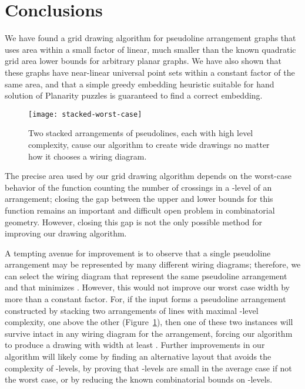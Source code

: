 \documentclass[oribibl]{llncs}
\begin{document}
\section{Conclusions}

We have found a grid drawing algorithm for pseudoline arrangement graphs that uses area within a small factor of linear, much smaller than the known quadratic grid area lower bounds for arbitrary planar graphs. We have also shown that these graphs have near-linear universal point sets within a constant factor of the same area, and that a simple greedy embedding heuristic suitable for hand solution of Planarity puzzles is guaranteed to find a correct embedding.

\begin{figure}[t]
\centering\texttt{[image: stacked-worst-case]}
\caption{Two stacked arrangements of  pseudolines, each with high level complexity, cause our algorithm to create wide drawings no matter how it chooses a wiring diagram.}
\label{fig:stacked-worst-case}
\vspace{-2ex}
\end{figure}

The precise area used by our grid drawing algorithm depends on the worst-case behavior of the function  counting the number of crossings in a -level of an arrangement; closing the gap between the upper and lower bounds for this function remains an important and difficult open problem in combinatorial geometry. However, closing this gap is not the only possible method for improving our drawing algorithm.

A tempting avenue for improvement is to observe that a single pseudoline arrangement may be represented by many different wiring diagrams; therefore, we can select the wiring diagram  that represent the same pseudoline arrangement and that minimizes . However, this would not improve our worst case width by more than a constant factor. For, if the input forms a pseudoline arrangement constructed by stacking two arrangements of  lines with maximal -level complexity, one above the other (Figure~\ref{fig:stacked-worst-case}), then one of these two instances will survive intact in any wiring diagram for the arrangement, forcing our algorithm to produce a drawing with width at least . Further improvements in our algorithm will likely come by finding an alternative layout that avoids the complexity of -levels, by proving that -levels are small in the average case if not the worst case, or by reducing the known combinatorial bounds on -levels.

{\raggedright

}
\end{document}
